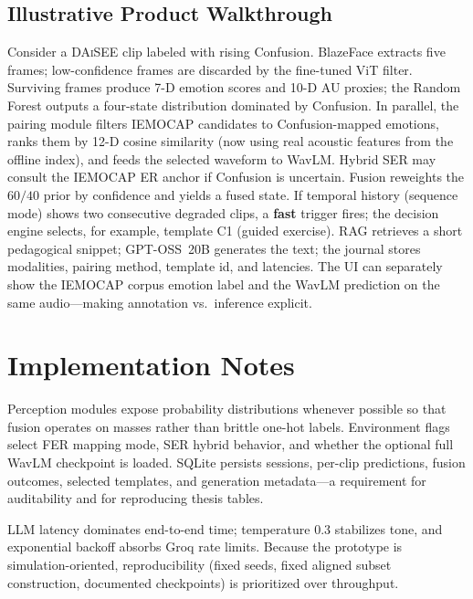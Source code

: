 \documentclass[conference]{IEEEtran}
\begin{document}
\subsection{Illustrative Product Walkthrough}
Consider a \textsc{DAiSEE} clip labeled with rising Confusion. BlazeFace
extracts five frames; low-confidence frames are discarded by the fine-tuned ViT
filter. Surviving frames produce 7-D emotion scores and 10-D AU proxies; the
Random Forest outputs a four-state distribution dominated by Confusion. In
parallel, the pairing module filters IEMOCAP candidates to Confusion-mapped
emotions, ranks them by 12-D cosine similarity (now using real acoustic
features from the offline index), and feeds the selected waveform to WavLM.
Hybrid SER may consult the IEMOCAP ER anchor if Confusion is uncertain. Fusion
reweights the $60/40$ prior by confidence and yields a fused state. If temporal
history (sequence mode) shows two consecutive degraded clips, a \textbf{fast}
trigger fires; the decision engine selects, for example, template C1 (guided
exercise). RAG retrieves a short pedagogical snippet; GPT-OSS~20B generates the
text; the journal stores modalities, pairing method, template id, and
latencies. The UI can separately show the IEMOCAP corpus emotion label and the
WavLM prediction on the same audio---making annotation vs.\ inference explicit.

\section{Implementation Notes}
\label{sec:impl}

Perception modules expose probability distributions whenever possible so that
fusion operates on masses rather than brittle one-hot labels. Environment
flags select FER mapping mode, SER hybrid behavior, and whether the optional
full WavLM checkpoint is loaded. SQLite persists sessions, per-clip
predictions, fusion outcomes, selected templates, and generation metadata---a
requirement for auditability and for reproducing thesis tables.

LLM latency dominates end-to-end time; temperature $0.3$ stabilizes tone, and
exponential backoff absorbs Groq rate limits. Because the prototype is
simulation-oriented, reproducibility (fixed seeds, fixed aligned subset
construction, documented checkpoints) is prioritized over throughput.
\end{document}
